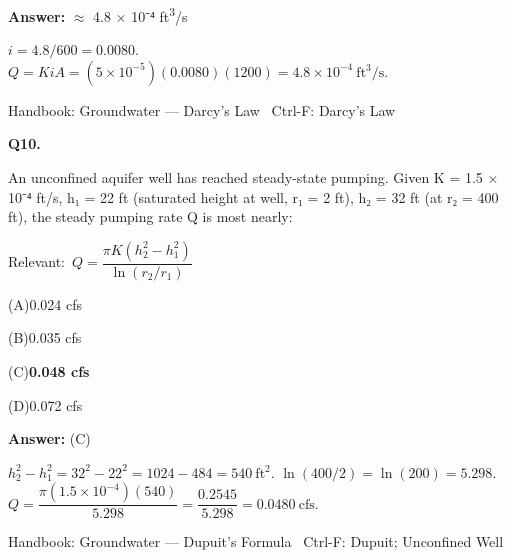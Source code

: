\documentclass[11pt]{article}
\newcommand{\correct}[1]{\textbf{#1}\;{\color{accent}$\checkmark$}}
\newcommand{\optline}[2]{\par\noindent\hspace{1.2em}(#1)\hspace{0.6em}#2}
\begin{document}
\vspace{2pt}\par\noindent\colorbox{boxbg}{\parbox{\dimexpr\linewidth-2\fboxsep\relax}{%
\vspace{2pt}\textbf{Answer:} $\approx$ 4.8 $\times$ 10⁻⁴ ft\textsuperscript{3}/s\par\vspace{2pt}
{\small $i = 4.8/600 = 0.0080$.  $Q = KiA = (5\times10^{-5})(0.0080)(1200) = 4.8\times10^{-4}\ \mathrm{ft^3/s}$.}\par\vspace{2pt}
{\footnotesize\color{soft}Handbook: Groundwater --- Darcy's Law \textbullet\ Ctrl-F: Darcy's Law}\vspace{2pt}
}}
\vspace{9pt}
\filbreak
\textbf{\color{accent}Q10.}\par\vspace{2pt}
An unconfined aquifer well has reached steady-state pumping. Given K = 1.5 $\times$ 10⁻⁴ ft/s, h₁ = 22 ft (saturated height at well, r₁ = 2 ft), h₂ = 32 ft (at r₂ = 400 ft), the steady pumping rate Q is most nearly:\par\vspace{3pt}
{\small\color{soft}Relevant:}\ $Q = \dfrac{\pi K(h_2^{2}-h_1^{2})}{\ln(r_2/r_1)}$\par\vspace{3pt}
\optline{A}{0.024 cfs}
\optline{B}{0.035 cfs}
\optline{C}{\correct{0.048 cfs}}
\optline{D}{0.072 cfs}
\par\vspace{3pt}
\vspace{2pt}\par\noindent\colorbox{boxbg}{\parbox{\dimexpr\linewidth-2\fboxsep\relax}{%
\vspace{2pt}\textbf{Answer:} (C)\par\vspace{2pt}
{\small $h_2^2 - h_1^2 = 32^2 - 22^2 = 1024 - 484 = 540\ \mathrm{ft^2}$.  $\ln(400/2) = \ln(200) = 5.298$.  $Q = \dfrac{\pi(1.5\times10^{-4})(540)}{5.298} = \dfrac{0.2545}{5.298} = 0.0480\ \mathrm{cfs}$.}\par\vspace{2pt}
{\footnotesize\color{soft}Handbook: Groundwater --- Dupuit's Formula \textbullet\ Ctrl-F: Dupuit; Unconfined Well}\vspace{2pt}
}}
\vspace{9pt}
\filbreak
\end{document}
